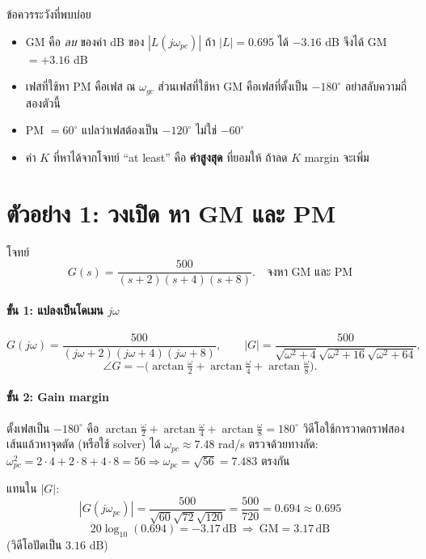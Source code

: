 \documentclass[12pt,a4paper]{article}
\newcommand{\dB}{\,\mathrm{dB}}
\newcommand{\jw}{j\omega}
\newcommand{\atan}{\operatorname{arctan}}
\begin{document}
\begin{warnbox}{ข้อควรระวังที่พบบ่อย}
\begin{itemize}[leftmargin=1.2em,itemsep=2pt]
\item GM คือ \emph{ลบ} ของค่า dB ของ $|L(j\omega_{pc})|$ ถ้า $|L|=0.695$ ได้ $-3.16$ dB จึงได้ GM $=+3.16$ dB
\item เฟสที่ใช้หา PM คือเฟส ณ $\omega_{gc}$ ส่วนเฟสที่ใช้หา GM คือเฟสที่ตั้งเป็น $-180^\circ$ อย่าสลับความถี่สองตัวนี้
\item PM $=60^\circ$ แปลว่าเฟสต้องเป็น $-120^\circ$ ไม่ใช่ $-60^\circ$
\item ค่า $K$ ที่หาได้จากโจทย์ ``at least'' คือ \textbf{ค่าสูงสุด} ที่ยอมให้ ถ้าลด $K$ margin จะเพิ่ม
\end{itemize}
\end{warnbox}

\section{ตัวอย่าง 1: วงเปิด หา GM และ PM}
\begin{exbox}{โจทย์}
\[
G(s)=\frac{500}{(s+2)(s+4)(s+8)}.\quad \text{จงหา GM และ PM}
\]
\end{exbox}

\paragraph{ขั้น 1: แปลงเป็นโดเมน $\jw$}
\[
G(\jw)=\frac{500}{(\jw+2)(\jw+4)(\jw+8)},\qquad
|G|=\frac{500}{\sqrt{\omega^2+4}\sqrt{\omega^2+16}\sqrt{\omega^2+64}},
\]
\[
\angle G=-\Big(\atan\tfrac{\omega}{2}+\atan\tfrac{\omega}{4}+\atan\tfrac{\omega}{8}\Big).
\]

\paragraph{ขั้น 2: Gain margin}
ตั้งเฟสเป็น $-180^\circ$ คือ $\atan\frac{\omega}{2}+\atan\frac{\omega}{4}+\atan\frac{\omega}{8}=180^\circ$ วิดีโอใช้การวาดกราฟสองเส้นแล้วหาจุดตัด (หรือใช้ solver) ได้ $\omega_{pc}\approx7.48$ rad/s ตรวจด้วยทางลัด: $\omega_{pc}^2=2\cdot4+2\cdot8+4\cdot8=56\Rightarrow\omega_{pc}=\sqrt{56}=7.483$ ตรงกัน

แทนใน $|G|$:
\[
|G(j\omega_{pc})|=\frac{500}{\sqrt{60}\sqrt{72}\sqrt{120}}=\frac{500}{720}=0.694\approx0.695
\]
\[
20\log_{10}(0.694)=-3.17\dB\ \Longrightarrow\ \boxed{\mathrm{GM}=3.17\dB}
\]
(วิดีโอปัดเป็น $3.16$ dB)
\end{document}

